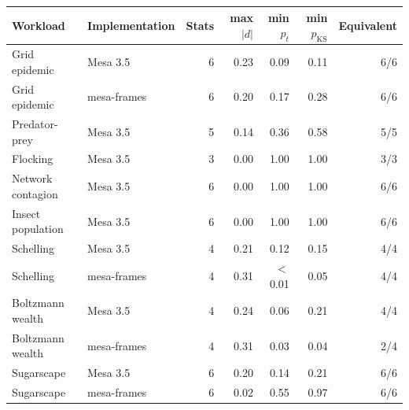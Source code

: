 \begin{tabular}{llrrrrr}
\toprule
Workload & Implementation & Stats & max $|d|$ & min $p_{t}$ & min $p_{\mathrm{KS}}$ & Equivalent \\
\midrule
Grid epidemic & Mesa 3.5 & 6 & 0.23 & 0.09 & 0.11 & 6/6 \\
Grid epidemic & mesa-frames & 6 & 0.20 & 0.17 & 0.28 & 6/6 \\
Predator-prey & Mesa 3.5 & 5 & 0.14 & 0.36 & 0.58 & 5/5 \\
Flocking & Mesa 3.5 & 3 & 0.00 & 1.00 & 1.00 & 3/3 \\
Network contagion & Mesa 3.5 & 6 & 0.00 & 1.00 & 1.00 & 6/6 \\
Insect population & Mesa 3.5 & 6 & 0.00 & 1.00 & 1.00 & 6/6 \\
Schelling & Mesa 3.5 & 4 & 0.21 & 0.12 & 0.15 & 4/4 \\
Schelling & mesa-frames & 4 & 0.31 & $<$0.01 & 0.05 & 4/4 \\
Boltzmann wealth & Mesa 3.5 & 4 & 0.24 & 0.06 & 0.21 & 4/4 \\
Boltzmann wealth & mesa-frames & 4 & 0.31 & 0.03 & 0.04 & 2/4 \\
Sugarscape & Mesa 3.5 & 6 & 0.20 & 0.14 & 0.21 & 6/6 \\
Sugarscape & mesa-frames & 6 & 0.02 & 0.55 & 0.97 & 6/6 \\
\bottomrule
\end{tabular}
